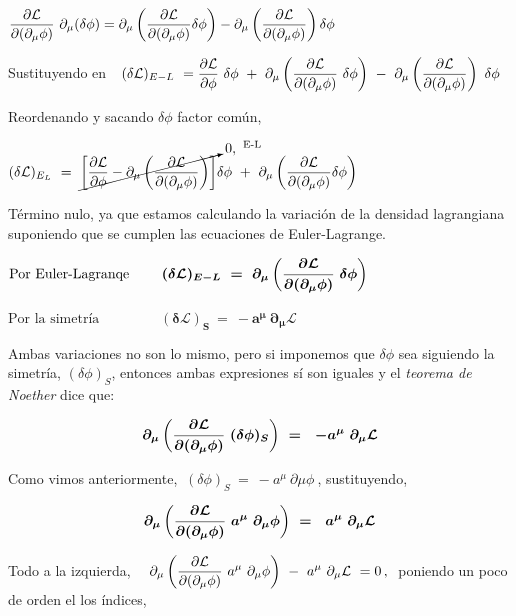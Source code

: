 $\displaystyle  \pdv{\mathcal L}{(\partial_\mu \phi)}  \ \partial_\mu (\delta \phi) = \partial_\mu \left( \pdv{\mathcal L}{(\partial_\mu \phi)} \delta \phi \right) - \partial_\mu \left( \pdv{\mathcal L}{(\partial_\mu \phi)} \right) \delta \phi$ 

Sustituyendo en  $\ \  \displaystyle (\delta \mathcal L)_{E-L} \ = \pdv{\mathcal L}{\phi} \ \delta \phi \ + \  \partial_\mu \left( \pdv{\mathcal L}{(\partial_\mu \phi)} \ \delta \phi \right) \ - \ \partial_\mu \left( \pdv{\mathcal L}{(\partial_\mu \phi)} \right) \ \delta \phi$

Reordenando y sacando $\delta \phi$ factor común,

$(\delta \mathcal L)_{E_L} \ = \ \displaystyle
\cancelto{0,\ \begin{tiny}^\text{E-L}\end{tiny} }{
\left[ \pdv{\mathcal L}{\phi} - \partial_\mu \left( \pdv{\mathcal L}{(\partial_\mu \phi)} \right) \right]
} \delta \phi \ + \ 
\partial_\mu \left( \pdv{\mathcal L}{(\partial_\mu \phi)} \delta \phi \right)\ $ 

Término nulo, ya que estamos calculando la variación de la densidad lagrangiana suponiendo que se cumplen las ecuaciones de Euler-Lagrange.

\hspace{2cm} $\text{Por Euler-Lagranqe } \quad \quad \boldsymbol{ (\delta \mathcal L)_{E-L} \ = \ \displaystyle
\partial_\mu \left( \pdv{\mathcal L}{(\partial_\mu \phi)} \ \delta \phi \right)\ }$

\hspace{2cm} $\text{Por la simetría } \qquad \qquad \boldsymbol{(\delta \mathcal L)_S \ = \ -a^\mu \ \partial_\mu \mathcal L}$

Ambas variaciones no son lo mismo, pero si imponemos que $\delta \phi$ sea siguiendo la simetría, $(\delta \phi)_S$, entonces ambas expresiones sí son iguales y el \emph{teorema de Noether} dice que:


$$  \displaystyle \boldsymbol{
\partial_\mu \left( \pdv{\mathcal L}{(\partial_\mu \phi)} \ (\delta \phi)_S \right)\ 
= \ \ -a^\mu \ \partial_\mu \mathcal L}$$

Como vimos anteriormente, $\ (\delta \phi)_S\ = \ -a^\mu \ \partial \mu \phi \ $, sustituyendo,

$$  \displaystyle \boldsymbol{\partial_\mu \left( \pdv{\mathcal L}{(\partial_\mu \phi)} \ a^\mu \ \partial_\mu \phi  \right)\ = \ \ a^\mu \ \partial_\mu \mathcal L}$$

Todo a la izquierda, $\quad \displaystyle \partial_\mu \left( \pdv{\mathcal L}{(\partial_\mu \phi)} \ a^\mu \ \partial_\mu \phi  \right)\ -  \ a^\mu \ \partial_\mu \mathcal L \ = 0\, , \ $ poniendo un poco de orden el los índices,

